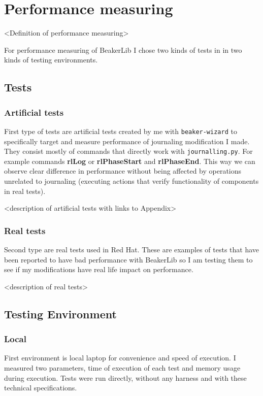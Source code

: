 \chapter{Performance measuring}
<Definition of performance measuring>

For performance measuring of BeakerLib I chose two kinds of tests in in two kinds of testing environments.

\section{Tests}

\subsection{Artificial tests}
First type of tests are artificial tests created by me with \texttt{beaker-wizard} to specifically target and measure performance of journaling modification I made. They consist mostly of commands that directly work with \texttt{journalling.py}. For example commands \textbf{rlLog} or \textbf{rlPhaseStart} and \textbf{rlPhaseEnd}. This way we can observe clear difference in performance without being affected by operations unrelated to journaling (executing actions that verify functionality of components in real tests). 

<description of artificial tests with links to Appendix>

\subsection{Real tests}
Second type are real tests used in Red Hat. These are examples of tests that have been reported to have bad performance with BeakerLib so I am testing them to see if my modifications have real life impact on performance.

<description of real tests>

\section{Testing Environment}

\subsection{Local}
First environment is local laptop for convenience and speed of execution. I measured  two parameters, time of execution of each test and memory usage during execution. Tests were run directly, without any harness and with these technical specifications. 

